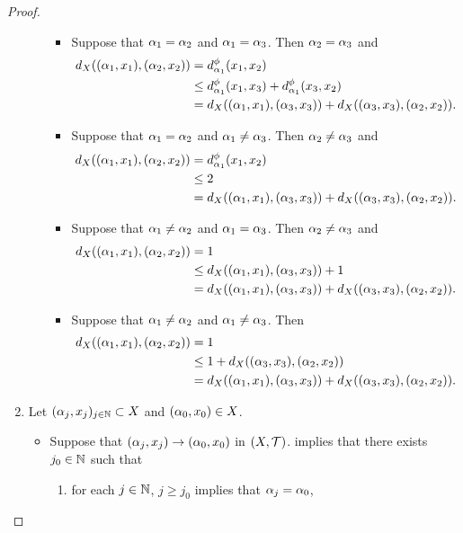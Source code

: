 \documentclass{book}
\begin{document}
\begin{proof}
\begin{enumerate}
\begin{enumerate}
\begin{itemize}
				\item Suppose that $\alpha_1 = \alpha_2$ and $\alpha_1 = \alpha_3$. Then $\alpha_2 = \alpha_3$ and 
				\begin{align*}
					d_X((\alpha_1, x_1), (\alpha_2, x_2))
					& = d_{\alpha_1}^{\phi}(x_1, x_2) \\
					& \leq d_{\alpha_1}^{\phi}(x_1, x_3) + d_{\alpha_1}^{\phi}(x_3, x_2) \\
					& = d_X((\alpha_1, x_1), (\alpha_3, x_3)) + d_X((\alpha_3, x_3), (\alpha_2, x_2)).
				\end{align*}
				\item Suppose that $\alpha_1 = \alpha_2$ and $\alpha_1 \neq \alpha_3$. Then $\alpha_2 \neq \alpha_3$ and 
				\begin{align*}
					d_X((\alpha_1, x_1), (\alpha_2, x_2))
					& = d_{\alpha_1}^{\phi}(x_1, x_2) \\
					& \leq 2 \\
					& = d_X((\alpha_1, x_1), (\alpha_3, x_3)) + d_X((\alpha_3, x_3), (\alpha_2, x_2)).
				\end{align*}
				\item Suppose that $\alpha_1 \neq \alpha_2$ and $\alpha_1 = \alpha_3$. Then $\alpha_2 \neq \alpha_3$ and 
				\begin{align*}
					d_X((\alpha_1, x_1), (\alpha_2, x_2))
					& = 1 \\
					& \leq d_X((\alpha_1, x_1), (\alpha_3, x_3)) + 1  \\
					& = d_X((\alpha_1, x_1), (\alpha_3, x_3)) + d_X((\alpha_3, x_3), (\alpha_2, x_2)).
				\end{align*}
				\item Suppose that $\alpha_1 \neq \alpha_2$ and $\alpha_1 \neq \alpha_3$. Then 
				\begin{align*}
					d_X((\alpha_1, x_1), (\alpha_2, x_2))
					& = 1 \\
					& \leq 1 + d_X((\alpha_3, x_3), (\alpha_2, x_2)) \\
					& = d_X((\alpha_1, x_1), (\alpha_3, x_3)) + d_X((\alpha_3, x_3), (\alpha_2, x_2)).
				\end{align*}
			\end{itemize}
		\end{enumerate}
		\item Let $(\alpha_j, x_j)_{j \in \mathbb{N}} \subset X$ and $(\alpha_0, x_0) \in X$. 
		\begin{itemize}
			\item Suppose that $(\alpha_j, x_j) \rightarrow (\alpha_0, x_0)$ in $(X, \mathcal{T})$.  implies that there exists $j_0 \in \mathbb{N}$ such that 
			\begin{enumerate}
				\item for each $j \in \mathbb{N}$, $j \geq j_0$ implies that $\alpha_j = \alpha_0$, 

\end{enumerate}
\end{itemize}
\end{enumerate}
\end{proof}
\end{document}

